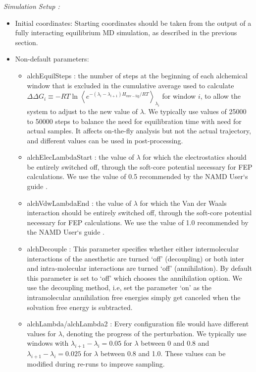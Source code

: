 \documentclass[12pt]{article}
\begin{document}
\textit{Simulation Setup :}
\begin{itemize}
\item Initial coordinates: Starting coordinates should be taken from the output of a fully interacting equilibrium MD simulation, as described in the previous section.  
\item Non-default parameters:
	\begin{itemize} 
	\item alchEquilSteps : the number of steps at the beginning of each alchemical window that is excluded in the cumulative  average used to calculate $\Delta\Delta G_{i} \equiv  -R T \ln \left \langle  e^{-( \lambda_{i} - \lambda_{i+1}) H_{\mathrm{env-lig}}/R T} \right \rangle_{\lambda_{i}}$ for window $i$, to allow the system to adjust to the new value of $\lambda$. We typically use values of 25000 to 50000 steps to balance the need for equilibration time with need for actual samples.  It affects on-the-fly analysis but not the actual trajectory, and different values can be used in post-processing. 
	\item alchElecLambdaStart : the value of $\lambda$ for which the electrostatics should be entirely switched off, through the soft-core potential necessary for FEP calculations.   We use the value of 0.5 recommended by the NAMD User`s guide \cite{Git---2017}.
	\item alchVdwLambdaEnd : the value of $\lambda$ for which the Van der Waals interaction should be entirely switched off, through the soft-core potential necessary for FEP calculations.   We use the value of 1.0 recommended by the NAMD User`s guide \cite{Git---2017}.
	\item alchDecouple : This parameter specifies whether either intermolecular interactions of the anesthetic are turned `off' (decoupling) or both inter and intra-molecular interactions are turned `off' (annihilation). By default this parameter is set to `off' which chooses the annihilation option. We use the decoupling method, i.e, set the parameter `on' as the intramolecular annihilation free energies simply get canceled when the solvation free energy is subtracted.
	\item alchLambda/alchLambda2 : Every configuration file would have different values for $\lambda$, denoting the progress of the perturbation. We typically use windows with $\lambda_{i+1} - \lambda_{i} = 0.05$ for $\lambda$ between 0 and 0.8 and $\lambda_{i+1} - \lambda_{i} = 0.025$ for $\lambda$ between 0.8 and 1.0. These values can be modified during re-runs to improve sampling.

\end{itemize}
\end{itemize}
\end{document}
